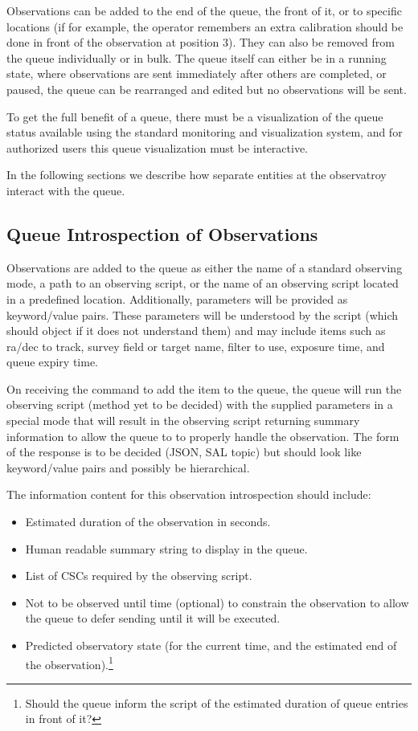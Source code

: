 \documentclass[TS,toc,lsstdraft]{lsstdoc}
\begin{document}
Observations can be added to the end of the queue, the front of it, or to specific locations (if for example, the operator remembers an extra calibration should be done in front of the observation at position 3).
They can also be removed from the queue individually or in bulk.
The queue itself can either be in a running state, where observations are sent immediately after others are completed, or paused, the queue can be rearranged and edited but no observations will be sent.

To get the full benefit of a queue, there must be a visualization of the queue status available using the standard monitoring and visualization system, and for authorized users this queue visualization must be interactive.

In the following sections we describe how separate entities at the observatroy interact with the queue.

\subsection{Queue Introspection of Observations}

Observations are added to the queue as either the name of a standard observing mode, a path to an observing script, or the name of an observing script located in a predefined location.
Additionally, parameters will be provided as keyword/value pairs.
These parameters will be understood by the script (which should object if it does not understand them) and may include items such as ra/dec to track, survey field or target name, filter to use, exposure time, and queue expiry time.

On receiving the command to add the item to the queue, the queue will run the observing script (method yet to be decided) with the supplied parameters in a special mode that will result in the observing script returning summary information to allow the queue to to properly handle the observation.
The form of the response is to be decided (JSON, SAL topic) but should look like keyword/value pairs and possibly be hierarchical.

The information content for this observation introspection should include:

\begin{itemize}
  \item Estimated duration of the observation in seconds.
  \item Human readable summary string to display in the queue.
  \item List of CSCs required by the observing script.
  \item Not to be observed until time (optional) to constrain the observation to allow the queue to defer sending until it will be executed.
  \item Predicted observatory state (for the current time, and the estimated end of the observation).\footnote{Should the queue inform the script of the estimated duration of queue entries in front of it?}
\end{itemize}
\end{document}
